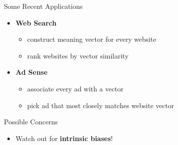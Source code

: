 \documentclass[professionalfonts, xcolor={usenames,svgnames,x11names,table}]{beamer}
\begin{document}
\begin{frame}[plain]
    \begin{center}
    \end{center}
\end{frame}

\begin{frame}{Some Recent Applications}
    \begin{itemize}
        \item \textbf{Web Search}
            \begin{itemize}
                \item construct meaning vector for every website
                \item rank websites by vector similarity
            \end{itemize}
        \item \textbf{Ad Sense}
            \begin{itemize}
                \item associate every ad with a vector
                \item pick ad that most closely matches website vector
            \end{itemize}
    \end{itemize}

    \begin{block}{Possible Concerns}
 \begin{itemize}
                    \item Watch out for \alert{\textbf{intrinsic biases}!}
            \end{itemize}
    \end{block}
\end{frame}
\end{document}
